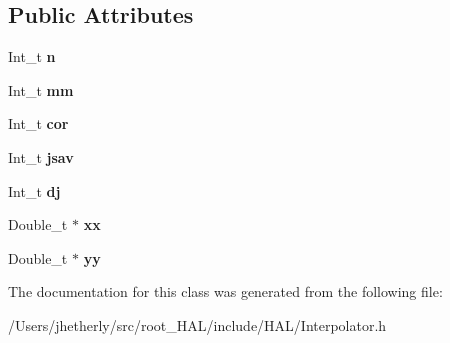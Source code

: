 \subsection*{Public Attributes}
\begin{DoxyCompactItemize}
\item 
\hypertarget{class_h_a_l_1_1_interp_base_a70c78b7c0ba2fe8a5ac3091ebb70f1ae}{Int\-\_\-t {\bfseries n}}\label{class_h_a_l_1_1_interp_base_a70c78b7c0ba2fe8a5ac3091ebb70f1ae}

\item 
\hypertarget{class_h_a_l_1_1_interp_base_a8691b520d0856373d8763be3cf0a9082}{Int\-\_\-t {\bfseries mm}}\label{class_h_a_l_1_1_interp_base_a8691b520d0856373d8763be3cf0a9082}

\item 
\hypertarget{class_h_a_l_1_1_interp_base_acfe70f15b2295e6b2399c02802072c9c}{Int\-\_\-t {\bfseries cor}}\label{class_h_a_l_1_1_interp_base_acfe70f15b2295e6b2399c02802072c9c}

\item 
\hypertarget{class_h_a_l_1_1_interp_base_a76921f15cd1908cdbe5bcc6afeb1ecc4}{Int\-\_\-t {\bfseries jsav}}\label{class_h_a_l_1_1_interp_base_a76921f15cd1908cdbe5bcc6afeb1ecc4}

\item 
\hypertarget{class_h_a_l_1_1_interp_base_af433768e4c59a1209919246ecb991c86}{Int\-\_\-t {\bfseries dj}}\label{class_h_a_l_1_1_interp_base_af433768e4c59a1209919246ecb991c86}

\item 
\hypertarget{class_h_a_l_1_1_interp_base_acdfb5ae98e96886c9055f36d29ebd25e}{Double\-\_\-t $\ast$ {\bfseries xx}}\label{class_h_a_l_1_1_interp_base_acdfb5ae98e96886c9055f36d29ebd25e}

\item 
\hypertarget{class_h_a_l_1_1_interp_base_a49d9cd794e1c97a0ed3f3bab3a999b8b}{Double\-\_\-t $\ast$ {\bfseries yy}}\label{class_h_a_l_1_1_interp_base_a49d9cd794e1c97a0ed3f3bab3a999b8b}

\end{DoxyCompactItemize}


The documentation for this class was generated from the following file\-:\begin{DoxyCompactItemize}
\item 
/\-Users/jhetherly/src/root\-\_\-\-H\-A\-L/include/\-H\-A\-L/Interpolator.\-h\end{DoxyCompactItemize}
